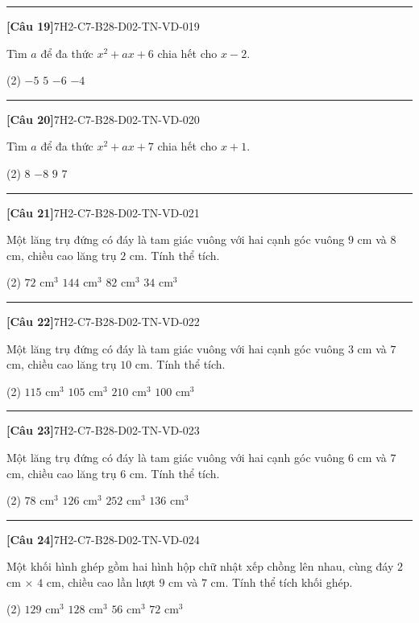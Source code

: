 \documentclass[12pt,a4paper]{article}
\newif\ifloigiai
\newenvironment{cauhoi}[2]{%
  \par\medskip\noindent\rule{\textwidth}{0.4pt}\par\nopagebreak
  \noindent\textbf{[#1]}\hfill{\scriptsize\ttfamily #2}\par\nopagebreak\smallskip}{\par}
\newcommand{\dapan}[1]{\ifloigiai\par\smallskip\noindent\textit{Đáp án:} \textbf{#1}\par\fi}
\begin{document}
\begin{cauhoi}{Câu 19}{7H2-C7-B28-D02-TN-VD-019}
Tìm $a$ để đa thức $x^{2}+ax+6$ chia hết cho $x-2$.
\begin{tasks}(2)
\task $-5$
\task $5$
\task $-6$
\task $-4$
\end{tasks}
\dapan{A}
\end{cauhoi}
\begin{cauhoi}{Câu 20}{7H2-C7-B28-D02-TN-VD-020}
Tìm $a$ để đa thức $x^{2}+ax+7$ chia hết cho $x+1$.
\begin{tasks}(2)
\task $8$
\task $-8$
\task $9$
\task $7$
\end{tasks}
\dapan{A}
\end{cauhoi}
\begin{cauhoi}{Câu 21}{7H2-C7-B28-D02-TN-VD-021}
Một lăng trụ đứng có đáy là tam giác vuông với hai cạnh góc vuông $9$ cm và $8$ cm, chiều cao lăng trụ $2$ cm. Tính thể tích.
\begin{tasks}(2)
\task $72\text{ cm}^3$
\task $144\text{ cm}^3$
\task $82\text{ cm}^3$
\task $34\text{ cm}^3$
\end{tasks}
\dapan{A}
\end{cauhoi}
\begin{cauhoi}{Câu 22}{7H2-C7-B28-D02-TN-VD-022}
Một lăng trụ đứng có đáy là tam giác vuông với hai cạnh góc vuông $3$ cm và $7$ cm, chiều cao lăng trụ $10$ cm. Tính thể tích.
\begin{tasks}(2)
\task $115\text{ cm}^3$
\task $105\text{ cm}^3$
\task $210\text{ cm}^3$
\task $100\text{ cm}^3$
\end{tasks}
\dapan{B}
\end{cauhoi}
\begin{cauhoi}{Câu 23}{7H2-C7-B28-D02-TN-VD-023}
Một lăng trụ đứng có đáy là tam giác vuông với hai cạnh góc vuông $6$ cm và $7$ cm, chiều cao lăng trụ $6$ cm. Tính thể tích.
\begin{tasks}(2)
\task $78\text{ cm}^3$
\task $126\text{ cm}^3$
\task $252\text{ cm}^3$
\task $136\text{ cm}^3$
\end{tasks}
\dapan{B}
\end{cauhoi}
\begin{cauhoi}{Câu 24}{7H2-C7-B28-D02-TN-VD-024}
Một khối hình ghép gồm hai hình hộp chữ nhật xếp chồng lên nhau, cùng đáy $2$ cm $\times$ $4$ cm, chiều cao lần lượt $9$ cm và $7$ cm. Tính thể tích khối ghép.
\begin{tasks}(2)
\task $129\text{ cm}^3$
\task $128\text{ cm}^3$
\task $56\text{ cm}^3$
\task $72\text{ cm}^3$
\end{tasks}
\dapan{B}
\end{cauhoi}
\end{document}
